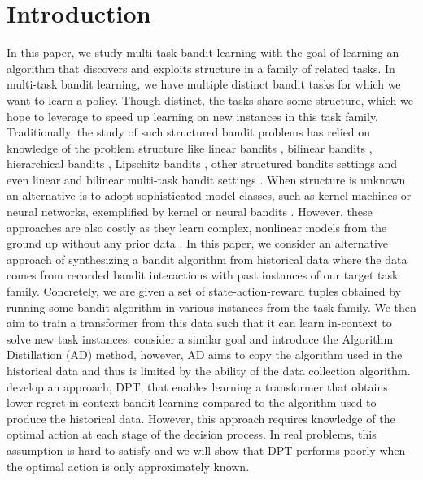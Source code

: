 \documentclass[10pt]{article}
\theoremstyle{plain}
\theoremstyle{definition}
\theoremstyle{remark}
\begin{document}
\section{Introduction}
\vspace*{-0.5em}
\label{sec:intro}
In this paper, we study multi-task bandit learning with the goal of learning an algorithm that discovers and exploits structure in a family of related tasks.
In multi-task bandit learning, we have multiple distinct bandit tasks for which we want to learn a policy. Though distinct, the tasks share some structure, which we hope to leverage to speed up learning on new instances in this task family.
Traditionally, the study of such structured bandit problems has relied on knowledge of the problem structure like linear bandits \citep{li2010contextual, abbasi2011improved, degenne2020gamification}, bilinear bandits \citep{jun2019bilinear}, hierarchical bandits \citep{hong2022deep, hong2022hierarchical}, Lipschitz bandits \citep{bubeck2008online, bubeck2011lipschitz, magureanu2014lipschitz},  other structured bandits settings \citep{riquelme2018deep, lattimore2019information, dong2021provable} and even linear and bilinear multi-task bandit settings \citep{yang2022nearly, du2023multi, mukherjee2023multi}.
When structure is unknown an alternative is to adopt sophisticated model classes, such as kernel machines or neural networks, exemplified by kernel or neural bandits \citep{valko2013finite, chowdhury2017kernelized, zhou2020neural, dai2022federated}. However, these approaches are also costly as they learn complex, nonlinear models from the ground up without any prior data \citep{justus2018predicting, zambaldi2018relational}.
 In this paper, we consider an alternative approach of synthesizing a bandit algorithm from historical data where the data comes from recorded bandit interactions with past instances of our target task family.
Concretely, we are given a set of state-action-reward tuples obtained by running some bandit algorithm in various instances from the task family.
We then aim to train a transformer \citep{vaswani2017attention} from this data such that it can learn in-context to solve new task instances.
\citet{laskin2022context} consider a similar goal and introduce the Algorithm Distillation (AD) method, however, AD aims to copy the algorithm used in the historical data and thus is limited by the ability of the data collection algorithm.
\citet{lee2023supervised} develop an approach, DPT, that enables learning a transformer that obtains lower regret in-context bandit learning compared to the algorithm used to produce the historical data. However, this approach requires knowledge of the optimal action at each stage of the decision process. In real problems, this assumption is hard to satisfy and we will show that DPT performs poorly when the optimal action is only approximately known.
\end{document}
